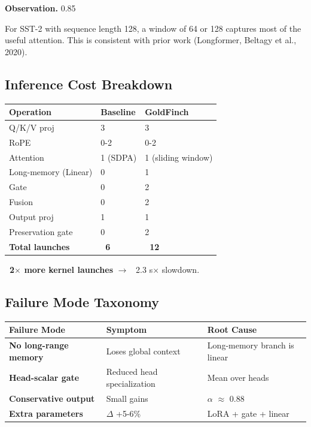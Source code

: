 \textbf{Observation.} 0.85

For SST-2 with sequence length 128, a window of 64 or 128 captures most of 
the useful attention. This is consistent with prior work (Longformer, 
Beltagy et al., 2020).

\subsection{Inference Cost Breakdown}

\begin{table}[H]
\centering
\small
\begin{tabular}{lll}
\toprule
\textbf{Operation} & \textbf{Baseline} & \textbf{GoldFinch} \\
\midrule
Q/K/V proj & 3 & 3 \\
RoPE & 0-2 & 0-2 \\
Attention & 1 (SDPA) & 1 (sliding window) \\
Long-memory (Linear) & 0 & 1 \\
Gate & 0 & 2 \\
Fusion & 0 & 2 \\
Output proj & 1 & 1 \\
Preservation gate & 0 & 2 \\
\textbf{Total launches} & \textbf{~6} & \textbf{~12} \\
\bottomrule
\end{tabular}
\end{table}

\textbf{~2$\times$ more kernel launches} $\to$ ~2.3 s$\times$ slowdown.

\subsection{Failure Mode Taxonomy}

\begin{table}[H]
\centering
\small
\begin{tabular}{lll}
\toprule
\textbf{Failure Mode} & \textbf{Symptom} & \textbf{Root Cause} \\
\midrule
\textbf{No long-range memory} & Loses global context & Long-memory branch is linear \\
\textbf{Head-scalar gate} & Reduced head specialization & Mean over heads \\
\textbf{Conservative output} & Small gains & $\alpha$ $\approx$ 0.88 \\
\textbf{Extra parameters} & $\Delta$ +5-6\% & LoRA + gate + linear \\
\bottomrule
\end{tabular}
\end{table}

